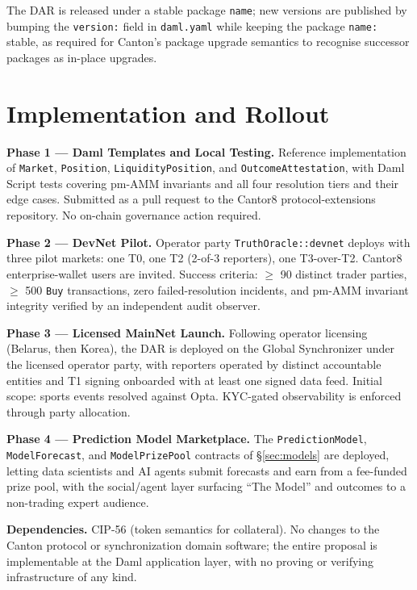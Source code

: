 \documentclass[11pt,a4paper]{article}
\begin{document}
The DAR is released under a stable package \texttt{name}; new versions are published by bumping the \texttt{version:} field in \texttt{daml.yaml} while keeping the package \texttt{name:} stable, as required for Canton's package upgrade semantics to recognise successor packages as in-place upgrades.

\section{Implementation and Rollout}

\noindent\textbf{Phase 1 --- Daml Templates and Local Testing.} Reference implementation of \texttt{Market}, \texttt{Position}, \texttt{LiquidityPosition}, and \texttt{OutcomeAttestation}, with Daml Script tests covering pm-AMM invariants and all four resolution tiers and their edge cases. Submitted as a pull request to the Cantor8 protocol-extensions repository. No on-chain governance action required.

\smallskip
\noindent\textbf{Phase 2 --- DevNet Pilot.} Operator party \texttt{TruthOracle::devnet} deploys with three pilot markets: one T0, one T2 (2-of-3 reporters), one T3-over-T2. Cantor8 enterprise-wallet users are invited. Success criteria: $\geq$ 90 distinct trader parties, $\geq$ 500 \texttt{Buy} transactions, zero failed-resolution incidents, and pm-AMM invariant integrity verified by an independent audit observer.

\smallskip
\noindent\textbf{Phase 3 --- Licensed MainNet Launch.} Following operator licensing (Belarus, then Korea), the DAR is deployed on the Global Synchronizer under the licensed operator party, with reporters operated by distinct accountable entities and T1 signing onboarded with at least one signed data feed. Initial scope: sports events resolved against Opta. KYC-gated observability is enforced through party allocation.

\smallskip
\noindent\textbf{Phase 4 --- Prediction Model Marketplace.} The \texttt{PredictionModel}, \texttt{ModelForecast}, and \texttt{ModelPrizePool} contracts of \S\ref{sec:models} are deployed, letting data scientists and AI agents submit forecasts and earn from a fee-funded prize pool, with the social/agent layer surfacing ``The Model'' and outcomes to a non-trading expert audience.

\smallskip
\noindent\textbf{Dependencies.} CIP-56 (token semantics for collateral). No changes to the Canton protocol or synchronization domain software; the entire proposal is implementable at the Daml application layer, with no proving or verifying infrastructure of any kind.
\end{document}
